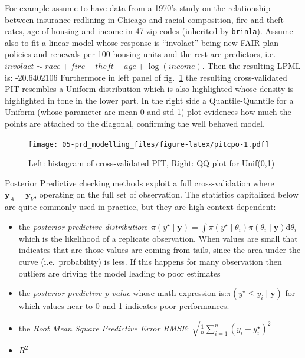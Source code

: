 \documentclass[
  12pt,
  a4paper,
  oneside]{book}
\newcommand{\passthrough}[1]{#1}
\providecommand{\tightlist}{%
  \setlength{\itemsep}{0pt}\setlength{\parskip}{0pt}}
\theoremstyle{definition}
\theoremstyle{definition}
\theoremstyle{definition}
\theoremstyle{remark}
\begin{document}
For example assume to have data from a 1970's study on the relationship between insurance redlining in Chicago and racial composition, fire and theft rates, age of housing and income in 47 zip codes (inherited by \passthrough{\lstinline!brinla!}\citep{brinla}). Assume also to fit a linear model whose response is ``involact'' being new FAIR plan policies and renewals per 100 housing units and the rest are predictors, i.e.~\(involact \sim race + fire +theft + age + \log(income)\).
Then the resulting LPML is: -20.6402106
Furthermore in left panel of fig.~\ref{fig:pitcpo} the resulting cross-validated PIT resembles a Uniform distribution which is also highlighted whose density is highlighted in tone in the lower part. In the right side a Quantile-Quantile for a Uniform (whose parameter are mean 0 and std 1) plot evidences how much the points are attached to the diagonal, confirming the well behaved model.

\begin{figure}
\centering
\texttt{[image: 05-prd\_modelling\_files/figure-latex/pitcpo-1.pdf]}
\caption{\label{fig:pitcpo}Left: histogram of cross-validated PIT, Right: QQ plot for Unif(0,1)}
\end{figure}

Posterior Predictive checking methods \citep{gelman1996posterior} exploit a full cross-validation where \(\boldsymbol{y}_{A} = \boldsymbol{y}_{V}\), operating on the full set of observation. The statistics capitalized below are quite commonly used in practice, but they are high context dependent:

\begin{itemize}
\tightlist
\item
  the \emph{posterior predictive distribution}: \(\pi(y^{\star} \mid \boldsymbol{y}) = \int \pi(y^{\star} \mid \theta_{i})\pi({\theta_{i}} \mid \boldsymbol{y})\mathrm{d}\theta_{i}\) which is the likelihood of a replicate observation. When values are small that indicates that are those values are coming from tails, since the area under the curve (i.e.~probability) is less. If this happens for many observation then outliers are driving the model leading to poor estimates
\item
  the \emph{posterior predictive p-value} whose math expression is:\(\pi(y^{\star} \leq y_{i} \mid \boldsymbol{y})\) for which values near to 0 and 1 indicates poor performances.
\item
  the \emph{Root Mean Square Predictive Error RMSE}: \(\sqrt{\frac{1}{n} \sum_{i=1}^{n}(y_{i}-{y}^{\star}_{i})^{2}}\)
\item
  \(R^2\)
\end{itemize}
\end{document}
